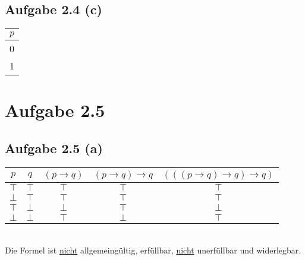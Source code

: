 \documentclass[12pt,a4paper]{article}
\begin{document}
\subsection*{Aufgabe 2.4 (c)}
\begin{tabular}{c}
$p$\\ \hline
0\\
1
\end{tabular}

\section*{Aufgabe 2.5}
\subsection*{Aufgabe 2.5 (a)}
\begin{tabular}{c|c||c|c|c}
$p$ & $q$ & $(p\to q)$ & $(p\to q)\to q$ & $(((p\to q)\to q)\to q)$\\ \hline
$\top$ & $\top$ & $\top$ & $\top$ & $\top$ \\
$\bot$ & $\top$ & $\top$ & $\top$ & $\top$ \\
$\top$ & $\bot$ & $\bot$ & $\top$ & $\bot$\\
$\bot$ & $\bot$ & $\top$ & $\bot$ & $\top$
\end{tabular}\\

Die Formel ist \underline{nicht} allgemeingültig, erfüllbar, \underline{nicht} unerfüllbar und widerlegbar.
\end{document}
